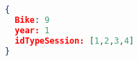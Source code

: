 \begin{lstlisting}[language=json,firstnumber=1]
{
  Bike: 9
  year: 1
  idTypeSession: [1,2,3,4]
}
\end{lstlisting}